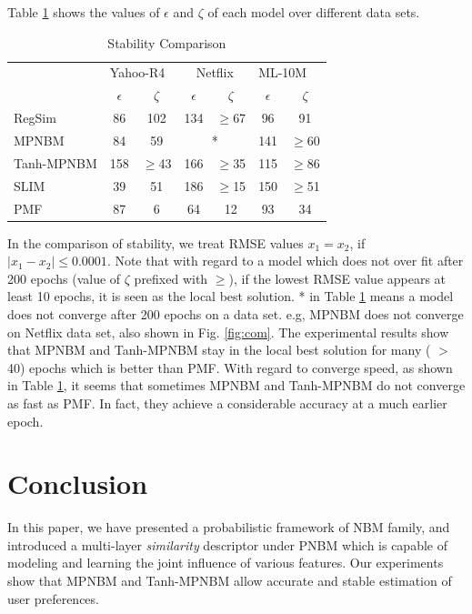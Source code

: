 \documentclass[conference]{IEEEtran}
\begin{document}
Table \ref{stable-table} shows the values of $\epsilon$ and $\zeta$ of each model over different data sets.
\begin{table}[h!]
\centering
\caption{Stability Comparison}
\begin{tabular}{|l|c|c|c|c|c|c|}
\hline
\multirow{2}{*}{} & \multicolumn{2}{l|}{Yahoo-R4} & \multicolumn{2}{c|}{Netflix} & \multicolumn{2}{l|}{ML-10M} \\ \cline{2-7}
                  &     $\epsilon$          &    $\zeta $           &              $\epsilon$  &      $\zeta $         &     $\epsilon$           &            $\zeta $  \\ \hline
RegSim              & 86            & 102           & 134           & $\geq$67           & 96            & 91          \\ \hline
MPNBM             & 84            & 59            & \multicolumn{2}{c|}{*}       & 141           & $\geq$60          \\ \hline
Tanh-MPNBM        & 158           & $\geq$43            & 166           & $\geq$35           & 115           & $\geq$86          \\ \hline
SLIM           & 39             & 51             & 186             & $\geq$15            & 150             & $\geq$51           \\ \hline
PMF               & 87            & 6             & 64            & 12           & 93            & 34          \\ \hline
\end{tabular}
\label{stable-table}
\end{table}
In the comparison of stability, we treat RMSE values $x_1 = x_2$, if $|x_1-x_2|\leq 0.0001$. Note that with regard to a model which does not over fit after 200 epochs (value of $\zeta$ prefixed with $\geq$), if the lowest RMSE value appears at least 10 epochs, it is seen as the local best solution. * in Table \ref{stable-table} means a model does not converge after 200 epochs on a data set. e.g, MPNBM does not converge on Netflix data set, also shown in Fig. \ref{fig:com}. The experimental results show that MPNBM and Tanh-MPNBM stay in the local best solution for many ( $>$ 40) epochs which is better than PMF. With regard to converge speed, as shown in Table \ref{stable-table}, it seems that sometimes MPNBM and Tanh-MPNBM do not converge as fast as PMF. In fact, they achieve a considerable accuracy at a much earlier epoch.

\section{Conclusion}
\label{conclusion}
In this paper, we have presented a probabilistic framework of NBM family, and introduced a multi-layer \emph{similarity} descriptor under PNBM which is capable of modeling and learning the joint influence of various features. Our experiments show that MPNBM and Tanh-MPNBM allow accurate and stable estimation of user preferences.
\end{document}
